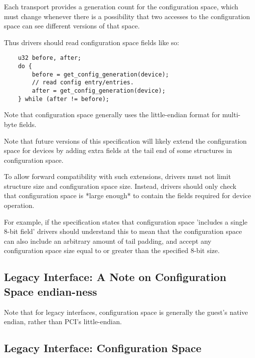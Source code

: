 Each transport provides a generation count for the configuration
space, which must change whenever there is a possibility that two
accesses to the configuration space can see different versions of that
space.

Thus drivers should read configuration space fields like so:

\begin{lstlisting}
	u32 before, after;
	do {
		before = get_config_generation(device);
		// read config entry/entries.
		after = get_config_generation(device);
	} while (after != before);
\end{lstlisting}

Note that configuration space generally uses the little-endian format
for multi-byte fields.

Note that future versions of this specification will likely
extend the configuration space for devices by adding extra fields
at the tail end of some structures in configuration space.

To allow forward compatibility with such extensions, drivers must
not limit structure size and configuration space size.  Instead,
drivers should only check that configuration space is *large enough* to
contain the fields required for device operation.

For example, if the specification states that configuration
space 'includes a single 8-bit field' drivers should understand this to mean that
the configuration space can also include an arbitrary amount of
tail padding, and accept any configuration space size equal to or
greater than the specified 8-bit size.

\subsection{Legacy Interface: A Note on Configuration Space endian-ness}\label{sec:Basic Facilities of a Virtio Device / Configuration Space / Legacy Interface: A Note on Configuration Space endian-ness}

Note that for legacy interfaces, configuration space is generally the
guest's native endian, rather than PCI's little-endian.

\subsection{Legacy Interface: Configuration Space}\label{sec:Basic Facilities of a Virtio Device / Configuration Space / Legacy Interface: Configuration Space}

